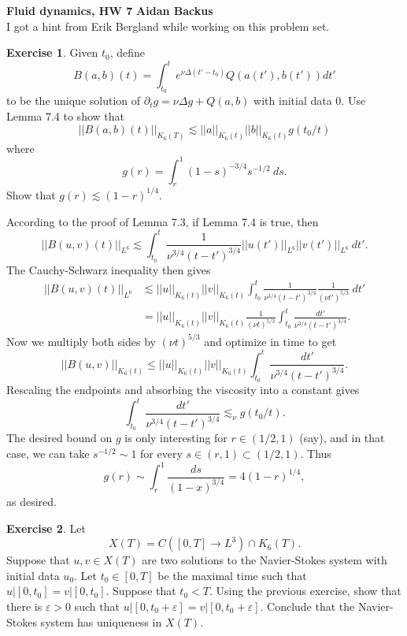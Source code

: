 \documentclass[10pt]{article}
\theoremstyle{definition}
\newtheorem{exer}{Exercise}
\begin{document}
\noindent
\large\textbf{Fluid dynamics, HW 7} \hfill \textbf{Aidan Backus} \\

I got a hint from Erik Bergland while working on this problem set.

\begin{exer}
Given $t_0$, define
$$B(a, b)(t) = \int_{t_0}^t e^{\nu \Delta(t' - t_0)} Q(a(t'), b(t')) dt'$$
to be the unique solution of $\partial_t g = \nu \Delta g + Q(a, b)$ with initial data $0$.
Use Lemma 7.4 to show that
$$||B(a, b)(t)||_{K_6(T)} \lesssim ||a||_{K_6(t)} ||b||_{K_6(t)} g(t_0/t)$$
where
$$g(r) = \int_r^1 (1 - s)^{-3/4} s^{-1/2} ~ds.$$
Show that $g(r) \lesssim (1 - r)^{1/4}$.
\end{exer}

According to the proof of Lemma 7.3, if Lemma 7.4 is true, then
$$||B(u, v)(t)||_{L^6} \lesssim \int_{t_0}^t \frac{1}{\nu^{3/4}(t - t')^{3/4}} ||u(t')||_{L^6} ||v(t')||_{L^6} ~dt'.$$
The Cauchy-Schwarz inequality then gives
\begin{align*}
||B(u, v)(t)||_{L^6} &\lesssim ||u||_{K_6(t)} ||v||_{K_6(t)} \int_{t_0}^t \frac{1}{\nu^{3/4}(t - t')^{3/4}} \frac{1}{(\nu t')^{5/3}} ~dt'\\
&= ||u||_{K_6(t)} ||v||_{K_6(t)} \frac{1}{(\nu t)^{5/3}} \int_{t_0}^t \frac{dt'}{\nu^{3/4}(t - t')^{3/4}}.
\end{align*}
Now we multiply both sides by $(\nu t)^{5/3}$ and optimize in time to get
$$||B(u, v)||_{K_6(t)} \leq ||u||_{K_6(t)} ||v||_{K_6(t)} \int_{t_0}^t \frac{dt'}{\nu^{3/4}(t - t')^{3/4}}.$$
Rescaling the endpoints and absorbing the viscosity into a constant gives
$$\int_{t_0}^t \frac{dt'}{\nu^{3/4}(t - t')^{3/4}} \lesssim_\nu g(t_0/t).$$
The desired bound on $g$ is only interesting for $r \in (1/2, 1)$ (say), and in that case, we can take $s^{-1/2} \sim 1$ for every $s \in (r, 1) \subset (1/2, 1)$.
Thus
$$g(r) \sim \int_r^1 \frac{ds}{(1 - x)^{3/4}} = 4(1 - r)^{1/4},$$
as desired.


\begin{exer}
Let
$$X(T) = C([0, T] \to L^3) \cap K_6(T).$$
Suppose that $u,v \in X(T)$ are two solutions to the Navier-Stokes system with initial data $u_0$.
Let $t_0 \in [0, T]$ be the maximal time such that $u|[0, t_0] = v|[0, t_0]$.
Suppose that $t_0 < T$.
Using the previous exercise, show that there is $\varepsilon > 0$ such that $u|[0, t_0 + \varepsilon] = v|[0, t_0 + \varepsilon]$.
Conclude that the Navier-Stokes system has uniqueness in $X(T)$.
\end{exer}
\end{document}
